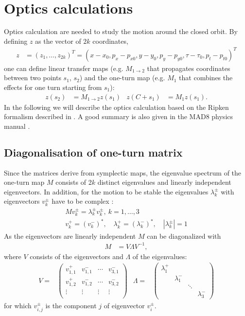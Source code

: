 \documentclass[english]{article}
\begin{document}
\section{Optics calculations}
\label{opt}
Optics calculation are needed to study the motion around the closed orbit. By defining $z$ as the vector of $2 k$ coordinates,  
\begin{align}\label{opt:eqn:1}
z&=(z_1,\ldots,z_{2k})^T=(x-x_0,p_x-p_{x0},y-y_0,p_y-p_{y0},\tau-\tau_0,p_t-p_{t0})^T
\end{align}
one can define linear transfer maps (e.g. $M_{1\to 2}$ that propagates coordinates between two points $s_1$, $s_2$) and the one-turn map (e.g. $M_1$ that combines the effects for one turn starting from $s_1$):
\begin{align}\label{opt:eqn:2}
z(s_2)&= M_{1\to 2} z(s_1) & z(C+s_1) &= M_1 z(s_1).
\end{align}
In the following we will describe the optics calculation based on the Ripken formalism described in \cite{willeke88}. A good summary is also given in the MAD8 physics manual \cite{mad8phys}.

\subsection{Diagonalisation of one-turn matrix}
\label{opt:sec:1}
Since the matrices derive from symplectic maps, the eigenvalue spectrum of the one-turn map $M$ consists of 2$k$ distinct eigenvalues and linearly independent eigenvectors. In addition, for the motion to be stable the eigenvalues $\lambda_k^{\pm}$ with eigenvectors $v_k^{\pm}$ have to be complex \cite{willeke88}:
\begin{align}
M v_k^\pm  =  \lambda_k^\pm v_k^\pm, \ k=1,\ldots, 3 \\
v_k^+=(v_k^-)^*, \quad \lambda_k^+=(\lambda_k^-)^*, \quad |\lambda_k^{\pm}|=1
\end{align}
As the eigenvectors are linearly independent $M$ can be diagonalized with
\begin{align}
M &= V \Lambda V^{-1},
\end{align}
where $V$ consists of the eigenvectors and $\Lambda$ of the eigenvalues:
\begin{align}
V=&\left(
\begin{array}{cccc}
v^+_{1,1} & v^-_{1,1} & \cdots & v^-_{3,1}\\
v^+_{1,2} & v^-_{1,2} & \cdots & v^-_{3,2}\\
\vdots    & \vdots    & \vdots & \vdots \\
\end{array}
\right)  &
\Lambda=&\left(
\begin{array}{cccc}
\lambda^+_1 &    & &\\
& \lambda^-_1 & &\\
& & \ddots & \\
& & & \lambda^-_3
\end{array}
\right)
\end{align}
for which $v^{\pm}_{i,j}$ is the component $j$ of eigenvector $v_i^{\pm}$.
\end{document}
